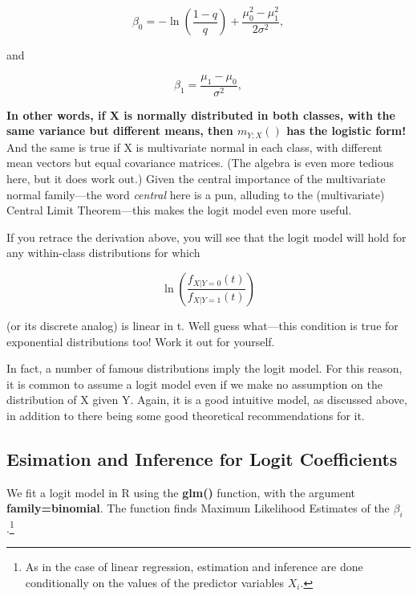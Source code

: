 \begin{equation}
\label{logitbeta0}
\beta_0 = -\ln{\left ( \frac{1-q}{q} \right )} + 
\frac{\mu^2_0 - \mu^2_1}{2\sigma^2},
\end{equation}

and

\begin{equation}
\label{logitbeta1}
\beta_1 = \frac{\mu_1 - \mu_0}{\sigma^2},
\end{equation} 

{\bf In other words, if X is normally distributed in both classes, with
the same variance but different means, then $m_{Y;X}()$ has the logistic
form!} And the same is true if X is multivariate normal in each class,
with different mean vectors but equal covariance matrices.  (The algebra
is even more tedious here, but it does work out.)  Given the central
importance of the multivariate normal family---the word {\it central}
here is a pun, alluding to the (multivariate) Central Limit
Theorem---this makes the logit model even more useful.

If you retrace the derivation above, you will see that the logit model
will hold for any within-class distributions for which 

\begin{equation}
\label{logitlogodds}
\ln \left ( \frac{f_{X|Y=0}(t)}{f_{X|Y=1}(t)} \right )
\end{equation}

(or its discrete analog) is linear in t.  Well guess what---this
condition is true for exponential distributions too!  Work it out for
yourself.


In fact, a number of famous distributions imply the logit model.  For
this reason, it is common to assume a logit model even if we make no
assumption on the distribution of X given Y.  Again, it is a good
intuitive model, as discussed above, in addition to there being some
good theoretical recommendations for it.

\subsection{Esimation and Inference for Logit Coefficients}

We fit a logit model in R using the {\bf glm()} function, with the
argument {\bf family=binomial}.  The function finds Maximum Likelihood
Estimates of the $\beta_i$.\footnote{As in the case of linear
regression, estimation and inference are done conditionally on the
values of the predictor variables $X_i$.} 


